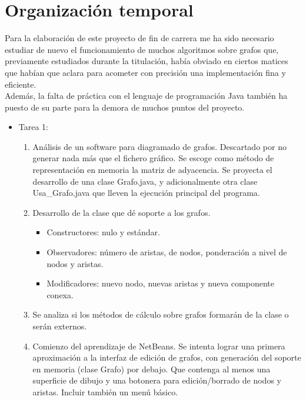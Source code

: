 \chapter{Organización temporal}
\label{chap:org.temporal}

Para la elaboración de este proyecto de fin de carrera me ha sido necesario estudiar de nuevo el funcionamiento de muchos algoritmos sobre grafos que, previamente estudiados durante la titulación, había obviado en ciertos matices que habían que aclara para acometer con precisión una implementación fina y eficiente.\\ Además, la falta de práctica con el lenguaje de programación Java también ha puesto de su parte para la demora de muchos puntos del proyecto.\\

\begin{itemize}
\item Tarea 1:\\

  \begin{enumerate}
  \item Análisis de un software para diagramado de grafos. Descartado por no generar nada más que el fichero gráfico. Se escoge como método de representación en memoria la matriz de adyacencia. Se proyecta el desarrollo de una clase Grafo.java, y adicionalmente otra clase Usa\_Grafo.java que lleven la ejecución principal del programa.
  \item Desarrollo de la clase que dé soporte a los grafos.
    \begin{itemize}
    \item Constructores: nulo y estándar.
    \item Observadores: número de aristas, de nodos, ponderación a nivel de nodos y aristas.
    \item Modificadores: nuevo nodo, nuevas aristas y nueva componente conexa.
    \end{itemize}
  \item Se analiza si los métodos de cálculo sobre grafos formarán de la clase o serán externos.
  \item Comienzo del aprendizaje de NetBeans. Se intenta lograr una primera aproximación a la interfaz de edición de grafos, con generación del soporte en memoria (clase Grafo) por debajo. Que contenga al menos una superficie de dibujo y una botonera para edición/borrado de nodos y aristas. Incluir también un menú básico.
  \end{enumerate}


\end{itemize}
